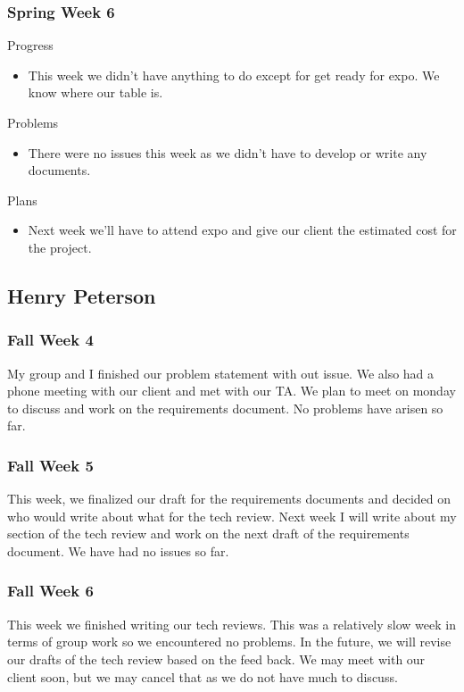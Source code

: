     \subsubsection{Spring Week 6}
        \noindent
        Progress
        \begin{itemize}
            \item This week we didn't have anything to do except for get ready for expo. We know where our table is.
        \end{itemize}
        
        \noindent
        Problems
        \begin{itemize}
            \item There were no issues this week as we didn't have to develop or write any documents.
        \end{itemize}
        
        \noindent
        Plans
        \begin{itemize}
            \item Next week we'll have to attend expo and give our client the estimated cost for the project.
        \end{itemize}




\subsection{Henry Peterson}
    \subsubsection{Fall Week 4}
        \noindent
        My group and I finished our problem statement with out issue. We also had a phone meeting with our client and met with our TA. We plan to meet on monday to discuss and work on the requirements document. No problems have arisen so far.
    \subsubsection{Fall Week 5}
        \noindent
        This week, we finalized our draft for the requirements documents and decided on who would write about what for the tech review. Next week I will write about my section of the tech review and work on the next draft of the requirements document. We have had no issues so far. 
    \subsubsection{Fall Week 6}
        \noindent
        This week we finished writing our tech reviews.
        This was a relatively slow week in terms of group work so we encountered no problems.
        In the future, we will revise our drafts of the tech review based on the feed back. We may meet with our client soon, but we may cancel that as we do not have much to discuss.
